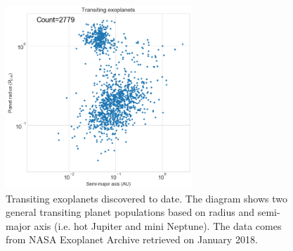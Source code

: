 \begin{figure}
\centering
\includegraphics[width=7cm]{figures/statistics_a_vs_R.png}
\caption{Transiting exoplanets discovered to date. The diagram shows two general transiting planet populations based on radius and semi-major axis (i.e. hot Jupiter and mini Neptune). The data comes from NASA Exoplanet Archive retrieved on January 2018.}
\label{fig:stat}
\end{figure}

